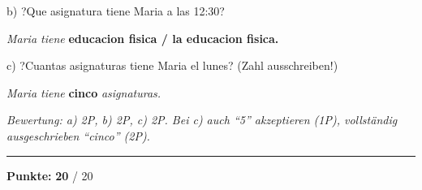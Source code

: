 \documentclass[11pt, a4paper]{article}
\newcommand{\maxpunkte}{20}
\newcommand{\loesung}[1]{\textcolor{loesung}{\textbf{#1}}}
\begin{document}
\noindent
b) ?Que asignatura tiene Maria a las 12:30?

\noindent
\textit{Maria tiene} \loesung{educacion fisica / la educacion fisica.}

\vspace{0.5em}

\noindent
c) ?Cuantas asignaturas tiene Maria el lunes? (Zahl ausschreiben!)

\noindent
\textit{Maria tiene} \loesung{cinco} \textit{asignaturas.}

\vspace{0.5em}

\textit{\textcolor{grau}{Bewertung: a) 2P, b) 2P, c) 2P. Bei c) auch ``5'' akzeptieren (1P), vollständig ausgeschrieben ``cinco'' (2P).}}


\vspace{20pt}
\hrule
\vspace{10pt}

\begin{flushright}
\textbf{Punkte:} \loesung{\maxpunkte} / \maxpunkte
\end{flushright}
\end{document}
